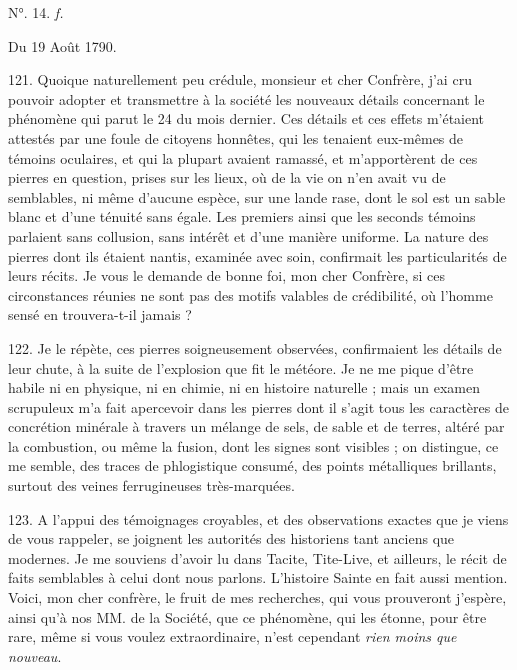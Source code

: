 \documentclass[a4paper, 11pt, oneside, polutonikogreek, french]{article}
\begin{document}
\begin{center}
N°. 14. \emph{f.}
\end{center}

\begin{center}
Du 19 Août 1790.
\end{center}

121. Quoique naturellement peu crédule, monsieur et cher Confrère, j'ai cru pouvoir adopter et transmettre à la société les nouveaux détails concernant le phénomène qui parut le 24 du mois dernier. Ces détails et ces effets m'étaient attestés par une foule de citoyens honnêtes, qui les tenaient eux-mêmes de témoins oculaires, et qui la plupart avaient ramassé, et m'apportèrent de ces pierres en question, prises sur les lieux, où de la vie on n'en avait vu de semblables, ni même d'aucune espèce, sur une lande rase, dont le sol est un sable blanc et d'une ténuité sans égale. Les premiers ainsi que les seconds témoins parlaient sans collusion, sans intérêt et d'une manière uniforme. La nature des pierres dont ils étaient nantis, examinée avec soin, confirmait les particularités de leurs récits. Je vous le demande de bonne foi, mon cher Confrère, si ces circonstances réunies ne sont pas des motifs valables de crédibilité, où l'homme sensé en trouvera-t-il jamais ?

122. Je le répète, ces pierres soigneusement observées, confirmaient les détails de leur chute, à la suite de l'explosion que fit le météore. Je ne me pique d'être habile ni en physique, ni en chimie, ni en histoire naturelle ; mais un examen scrupuleux m'a fait apercevoir dans les pierres dont il s'agit tous les caractères de concrétion minérale à travers un mélange de sels, de sable et de terres, altéré par la combustion, ou même la fusion, dont les signes sont visibles ; on distingue, ce me semble, des traces de phlogistique consumé, des points métalliques brillants, surtout des veines ferrugineuses très-marquées.

123. A l'appui des témoignages croyables, et des observations exactes que je viens de vous rappeler, se joignent les autorités des historiens tant anciens que modernes. Je me souviens d'avoir lu dans Tacite, Tite-Live, et ailleurs, le récit de faits semblables à celui dont nous parlons. L'histoire Sainte en fait aussi mention. Voici, mon cher confrère, le fruit de mes recherches, qui vous prouveront j'espère, ainsi qu'à nos MM. de la Société, que ce phénomène, qui les étonne, pour être rare, même si vous voulez extraordinaire, n'est cependant \emph{rien moins que nouveau}.
\end{document}
